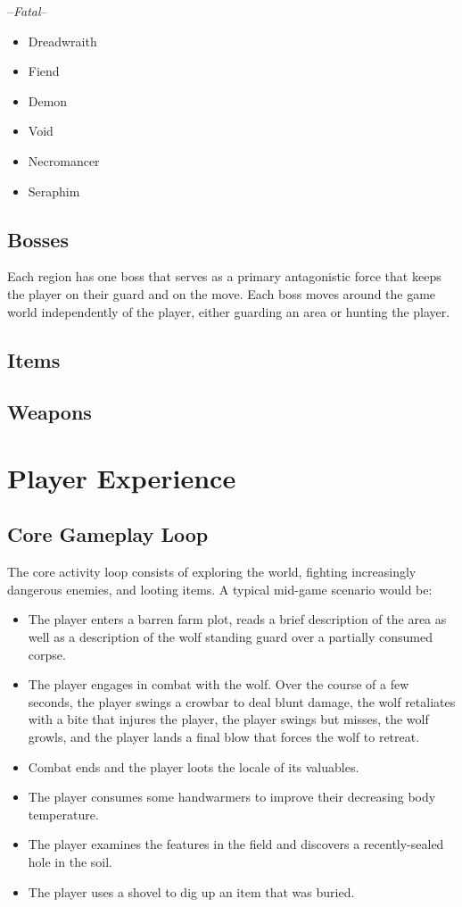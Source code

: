 \documentclass[11pt]{article}
\begin{document}
	--\textit{Fatal}--
	\begin{itemize}
		\item Dreadwraith
		\item Fiend
		\item Demon
		\item Void
		\item Necromancer
		\item Seraphim
	\end{itemize}
	
	\subsection{Bosses}
	
	Each region has one boss that serves as a primary antagonistic force that keeps the player on their guard and on the move. Each boss moves around the game world independently of the player, either guarding an area or hunting the player.
	
	\subsection{Items}
	
	\subsection{Weapons}
	
	\section{Player Experience}
	\subsection{Core Gameplay Loop}
	
	The core activity loop consists of exploring the world, fighting increasingly dangerous enemies, and looting items. A typical mid-game scenario would be:
	
	\begin{itemize}
		\item The player enters a barren farm plot, reads a brief description of the area as well as a description of the wolf standing guard over a partially consumed corpse.
		\item The player engages in combat with the wolf. Over the course of a few seconds, the player swings a crowbar to deal blunt damage, the wolf retaliates with a bite that injures the player, the player swings but misses, the wolf growls, and the player lands a final blow that forces the wolf to retreat.
		\item Combat ends and the player loots the locale of its valuables.
		\item The player consumes some handwarmers to improve their decreasing body temperature.
		\item The player examines the features in the field and discovers a recently-sealed hole in the soil.
		\item The player uses a shovel to dig up an item that was buried.
	\end{itemize}
	
\end{document}
